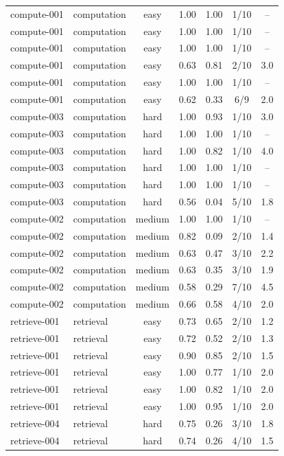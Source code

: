\begin{table}[t]
\begin{tabular}{llccccc}
compute-001 & computation & easy & 1.00 & 1.00 & 1/10 & -- \\
compute-001 & computation & easy & 1.00 & 1.00 & 1/10 & -- \\
compute-001 & computation & easy & 1.00 & 1.00 & 1/10 & -- \\
compute-001 & computation & easy & 0.63 & 0.81 & 2/10 & 3.0 \\
compute-001 & computation & easy & 1.00 & 1.00 & 1/10 & -- \\
compute-001 & computation & easy & 0.62 & 0.33 & 6/9 & 2.0 \\
compute-003 & computation & hard & 1.00 & 0.93 & 1/10 & 3.0 \\
compute-003 & computation & hard & 1.00 & 1.00 & 1/10 & -- \\
compute-003 & computation & hard & 1.00 & 0.82 & 1/10 & 4.0 \\
compute-003 & computation & hard & 1.00 & 1.00 & 1/10 & -- \\
compute-003 & computation & hard & 1.00 & 1.00 & 1/10 & -- \\
compute-003 & computation & hard & 0.56 & 0.04 & 5/10 & 1.8 \\
compute-002 & computation & medium & 1.00 & 1.00 & 1/10 & -- \\
compute-002 & computation & medium & 0.82 & 0.09 & 2/10 & 1.4 \\
compute-002 & computation & medium & 0.63 & 0.47 & 3/10 & 2.2 \\
compute-002 & computation & medium & 0.63 & 0.35 & 3/10 & 1.9 \\
compute-002 & computation & medium & 0.58 & 0.29 & 7/10 & 4.5 \\
compute-002 & computation & medium & 0.66 & 0.58 & 4/10 & 2.0 \\
retrieve-001 & retrieval & easy & 0.73 & 0.65 & 2/10 & 1.2 \\
retrieve-001 & retrieval & easy & 0.72 & 0.52 & 2/10 & 1.3 \\
retrieve-001 & retrieval & easy & 0.90 & 0.85 & 2/10 & 1.5 \\
retrieve-001 & retrieval & easy & 1.00 & 0.77 & 1/10 & 2.0 \\
retrieve-001 & retrieval & easy & 1.00 & 0.82 & 1/10 & 2.0 \\
retrieve-001 & retrieval & easy & 1.00 & 0.95 & 1/10 & 2.0 \\
retrieve-004 & retrieval & hard & 0.75 & 0.26 & 3/10 & 1.8 \\
retrieve-004 & retrieval & hard & 0.74 & 0.26 & 4/10 & 1.5 \\

\end{tabular}
\end{table}

